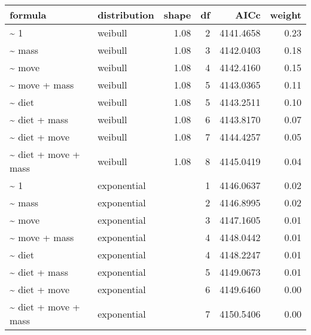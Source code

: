 \begin{table}[ht]
\centering
\begin{tabular}{llrrrr}
 formula & distribution & shape & df & AICc & weight \\ 
  \hline
\~{} 1 & weibull & 1.08 & 2 & 4141.4658 & 0.23 \\ 
  \~{} mass & weibull & 1.08 & 3 & 4142.0403 & 0.18 \\ 
  \~{} move & weibull & 1.08 & 4 & 4142.4160 & 0.15 \\ 
  \~{} move + mass & weibull & 1.08 & 5 & 4143.0365 & 0.11 \\ 
  \~{} diet & weibull & 1.08 & 5 & 4143.2511 & 0.10 \\ 
  \~{} diet + mass & weibull & 1.08 & 6 & 4143.8170 & 0.07 \\ 
  \~{} diet + move & weibull & 1.08 & 7 & 4144.4257 & 0.05 \\ 
  \~{} diet + move + mass & weibull & 1.08 & 8 & 4145.0419 & 0.04 \\ 
  \~{} 1 & exponential &  & 1 & 4146.0637 & 0.02 \\ 
  \~{} mass & exponential &  & 2 & 4146.8995 & 0.02 \\ 
  \~{} move & exponential &  & 3 & 4147.1605 & 0.01 \\ 
  \~{} move + mass & exponential &  & 4 & 4148.0442 & 0.01 \\ 
  \~{} diet & exponential &  & 4 & 4148.2247 & 0.01 \\ 
  \~{} diet + mass & exponential &  & 5 & 4149.0673 & 0.01 \\ 
  \~{} diet + move & exponential &  & 6 & 4149.6460 & 0.00 \\ 
  \~{} diet + move + mass & exponential &  & 7 & 4150.5406 & 0.00 \\ 
  \end{tabular}
\label{tab:nag}
\end{table}
